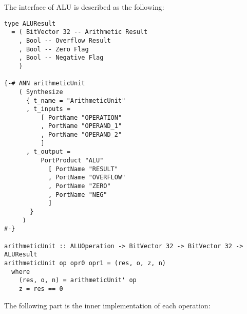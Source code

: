 The interface of ALU is described as the following:
\begin{verbatim}
type ALUResult
  = ( BitVector 32 -- Arithmetic Result
    , Bool -- Overflow Result
    , Bool -- Zero Flag
    , Bool -- Negative Flag
    )

{-# ANN arithmeticUnit
    ( Synthesize
      { t_name = "ArithmeticUnit"
      , t_inputs =
          [ PortName "OPERATION"
          , PortName "OPERAND_1"
          , PortName "OPERAND_2"
          ]
      , t_output =
          PortProduct "ALU"
            [ PortName "RESULT"
            , PortName "OVERFLOW"
            , PortName "ZERO"
            , PortName "NEG"
            ]
       }
     )
#-}

arithmeticUnit :: ALUOperation -> BitVector 32 -> BitVector 32 -> ALUResult
arithmeticUnit op opr0 opr1 = (res, o, z, n)
  where
    (res, o, n) = arithmeticUnit' op
    z = res == 0
\end{verbatim}
The following part is the inner implementation of each operation:
